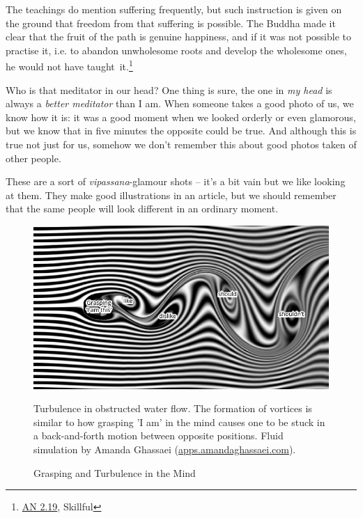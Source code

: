 The teachings do mention suffering frequently, but such instruction is
given on the ground that freedom from that suffering is possible. The
Buddha made it clear that the fruit of the path is genuine happiness,
and if it was not possible to practise it, i.e. to abandon unwholesome
roots and develop the wholesome ones, he would not have taught~it.\footnote{\href{https://suttacentral.net/an2.11-20/en/thanissaro}{AN 2.19}, Skillful}

Who is that meditator in our head? One thing is sure, the one in
\emph{my head} is always a \emph{better meditator} than I am. When
someone takes a good photo of us, we know how it is: it was a good
moment when we looked orderly or even glamorous, but we know that in
five minutes the opposite could be true. And although this is true not
just for us, somehow we don't remember this about good photos taken of
other people.

These are a sort of \emph{vipassana}-glamour shots -- it's a bit vain
but we like looking at them. They make good illustrations in an article,
but we should remember that the same people will look different in an
ordinary moment.

\clearpage
\figurepagelayout
\null\vfill

\vspace*{-4\baselineskip}

\begin{figure}[h]
\caption{Grasping and Turbulence in the Mind}\label{fig-grasping-turbulence}

\hspace*{-2.5mm}%
\includegraphics[width=\linewidth]{./manuscript/tex/diagrams/grasping-turbulence.pdf}

\bigskip

\hspace*{10mm}%
\begin{minipage}{\linewidth-20mm}
\footnotesize
Turbulence in obstructed water flow.
The formation of vortices is similar to how grasping 'I am' in the mind
causes one to be stuck in a back-and-forth motion between opposite positions.
Fluid simulation by Amanda Ghassaei (\href{http://apps.amandaghassaei.com/VortexShedding/}{apps.amandaghassaei.com}).
\end{minipage}

\end{figure}

